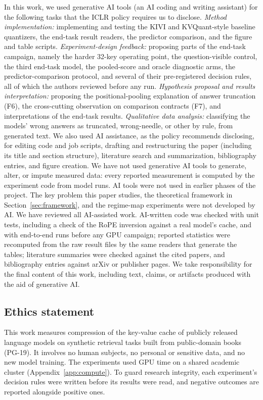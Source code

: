 \documentclass{article}
\theoremstyle{definition}
\begin{document}
In this work, we used generative AI tools (an AI coding and writing assistant) for the following tasks that the ICLR policy requires us to disclose.
\emph{Method implementation:} implementing and testing the KIVI and KVQuant-style baseline quantizers, the end-task result readers, the predictor comparison, and the figure and table scripts.
\emph{Experiment-design feedback:} proposing parts of the end-task campaign, namely the harder 32-key operating point, the question-visible control, the third end-task model, the pooled-score and oracle diagnostic arms, the predictor-comparison protocol, and several of their pre-registered decision rules, all of which the authors reviewed before any run.
\emph{Hypothesis proposal and results interpretation:} proposing the positional-pooling explanation of answer truncation (F6), the cross-cutting observation on comparison contracts (F7), and interpretations of the end-task results.
\emph{Qualitative data analysis:} classifying the models' wrong answers as truncated, wrong-needle, or other by rule, from generated text.
We also used AI assistance, as the policy recommends disclosing, for editing code and job scripts, drafting and restructuring the paper (including its title and section structure), literature search and summarization, bibliography entries, and figure creation.
We have not used generative AI tools to generate, alter, or impute measured data: every reported measurement is computed by the experiment code from model runs.  
AI tools were not used in earlier phases of the project. The key problem this paper studies, the theoretical framework in Section~\ref{sec:framework}, and the regime-map experiments were not developed by AI. 
We have reviewed all AI-assisted work.  AI-written code was checked with unit tests, including a check of the RoPE inversion against a real model's cache, and with end-to-end runs before any GPU campaign; reported statistics were recomputed from the raw result files by the same readers that generate the tables; literature summaries were checked against the cited papers, and bibliography entries against arXiv or publisher pages.  We take responsibility for the final content of this work, including text, claims, or artifacts produced with the aid of generative AI.

\subsection*{Ethics statement}

This work measures compression of the key-value cache of publicly released language models on synthetic retrieval tasks built from public-domain books (PG-19).  It involves no human subjects, no personal or sensitive data, and no new model training.  The experiments used GPU time on a shared academic cluster (Appendix~\ref{app:compute}).  To guard research integrity, each experiment's decision rules were written before its results were read, and negative outcomes are reported alongside positive ones.
\end{document}
